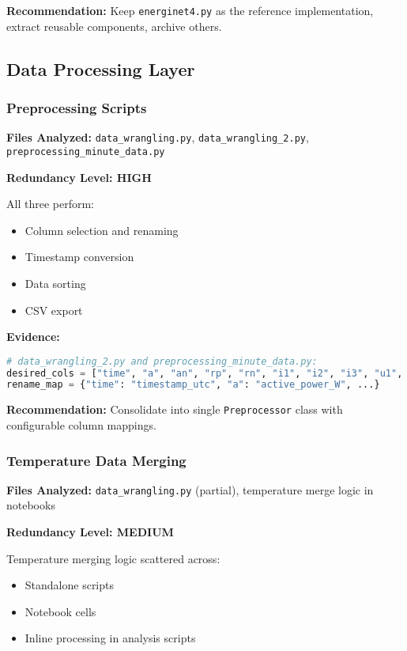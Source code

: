 \documentclass[11pt,a4paper]{article}
\begin{document}
\textbf{Recommendation:} Keep \texttt{energinet4.py} as the reference implementation, extract reusable components, archive others.

\subsection{Data Processing Layer}

\subsubsection{Preprocessing Scripts}

\textbf{Files Analyzed:} \texttt{data\_wrangling.py}, \texttt{data\_wrangling\_2.py}, \texttt{preprocessing\_minute\_data.py}

\textbf{Redundancy Level: HIGH}

All three perform:
\begin{itemize}
    \item Column selection and renaming
    \item Timestamp conversion
    \item Data sorting
    \item CSV export
\end{itemize}

\textbf{Evidence:}
\begin{lstlisting}[language=Python, caption={Duplicate preprocessing logic}]
# data_wrangling_2.py and preprocessing_minute_data.py:
desired_cols = ["time", "a", "an", "rp", "rn", "i1", "i2", "i3", "u1", "u2", "u3", "meter_id"]
rename_map = {"time": "timestamp_utc", "a": "active_power_W", ...}
\end{lstlisting}

\textbf{Recommendation:} Consolidate into single \texttt{Preprocessor} class with configurable column mappings.

\subsubsection{Temperature Data Merging}

\textbf{Files Analyzed:} \texttt{data\_wrangling.py} (partial), temperature merge logic in notebooks

\textbf{Redundancy Level: MEDIUM}

Temperature merging logic scattered across:
\begin{itemize}
    \item Standalone scripts
    \item Notebook cells
    \item Inline processing in analysis scripts
\end{itemize}
\end{document}
